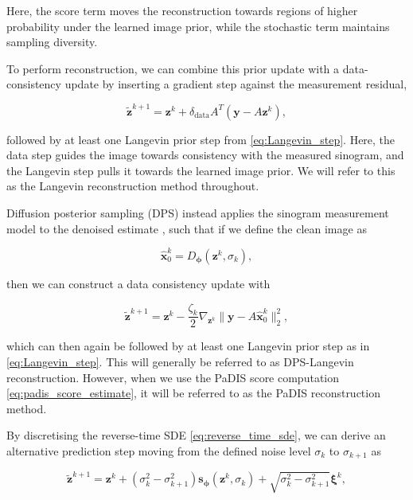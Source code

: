 Here, the score term moves the reconstruction towards regions of higher probability under the learned image prior, while the stochastic term maintains sampling diversity.

To perform reconstruction, we can combine this prior update with a data-consistency update by inserting a gradient step against the measurement residual,

\begin{equation}
\tilde{\mathbf{z}}^{k+1}
=
\mathbf{z}^k
+
\delta_{\mathrm{data}}
A^T(\mathbf{y}-A\mathbf{z}^k),
\label{eq:langevin_data_update}
\end{equation}

followed by at least one Langevin prior step from \eqref{eq:Langevin_step}. Here, the data step guides the image towards consistency with the measured sinogram, and the Langevin step pulls it towards the learned image prior. We will refer to this as the Langevin reconstruction method throughout.

Diffusion posterior sampling (DPS) instead applies the sinogram measurement model to the denoised estimate \cite{}, such that if we define the clean image as

\begin{equation}
\hat{\mathbf{x}}_0^k
=
D_{\boldsymbol{\phi}}(\mathbf{z}^k,\sigma_k),
\label{eq:dps_clean_estimate}
\end{equation}

then we can construct a data consistency update with

\begin{equation}
\tilde{\mathbf{z}}^{k+1}
=
\mathbf{z}^k
-
\frac{\zeta_k}{2}
\nabla_{\mathbf{z}^k}
\|\mathbf{y}-A\hat{\mathbf{x}}_0^k\|_2^2,
\label{eq:dps_data_update}
\end{equation}

which can then again be followed by at least one Langevin prior step as in \eqref{eq:Langevin_step}. This will generally be referred to as DPS-Langevin reconstruction. However, when we use the PaDIS score computation \autoref{eq:padis_score_estimate}, it will be referred to as the PaDIS reconstruction method.

By discretising the reverse-time SDE \eqref{eq:reverse_time_sde}, we can derive an alternative prediction step moving from the defined noise level $\sigma_k$ to $\sigma_{k+1}$ as

\begin{equation}
\tilde{\mathbf{z}}^{k+1}
=
\mathbf{z}^k
+
(\sigma_k^2-\sigma_{k+1}^2)
\mathbf{s}_{\boldsymbol{\phi}}(\mathbf{z}^k,\sigma_k)
+
\sqrt{\sigma_k^2-\sigma_{k+1}^2}\boldsymbol{\xi}^k,
\label{eq:pc_predictor_step}
\end{equation}

